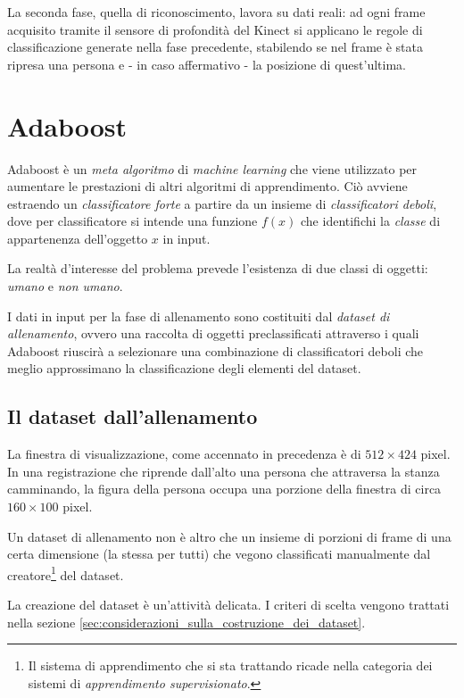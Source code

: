 \documentclass[a4paper,11pt,oneside]{article}
\begin{document}
			La seconda fase, quella di riconoscimento, lavora su dati reali: ad ogni frame acquisito tramite il sensore di profondità del Kinect si applicano le regole di classificazione generate nella fase precedente, stabilendo se nel frame è stata ripresa una persona e - in caso affermativo - la posizione di quest'ultima.
	

	\section{Adaboost} %
	\label{sec:adaboost}
		Adaboost è un \emph{meta algoritmo} di \emph{machine learning} che viene utilizzato per aumentare le prestazioni di altri algoritmi di apprendimento. Ciò avviene estraendo un \emph{classificatore forte} a partire da un insieme di \emph{classificatori deboli}, dove per classificatore si intende una funzione $f(x)$ che identifichi la \emph{classe} di appartenenza dell'oggetto $x$ in input.

		La realtà d'interesse del problema prevede l'esistenza di due classi di oggetti: \emph{umano} e \emph{non umano}.

		I dati in input per la fase di allenamento sono costituiti dal \emph{dataset di allenamento}, ovvero una raccolta di oggetti preclassificati attraverso i quali Adaboost riuscirà a selezionare una combinazione di classificatori deboli che meglio approssimano la classificazione degli elementi del dataset.

		\subsection{Il dataset dall'allenamento} %
		\label{sub:il_dataset_dall_allenamento}
			La finestra di visualizzazione, come accennato in precedenza è di $512 \times 424$ pixel. In una registrazione che riprende dall'alto una persona che attraversa la stanza camminando, la figura della persona occupa una porzione della finestra di circa $160 \times 100$ pixel.

			Un dataset di allenamento non è altro che un insieme di porzioni di frame di una certa dimensione (la stessa per tutti) che vegono classificati manualmente dal creatore\footnote{Il sistema di apprendimento che si sta trattando ricade nella categoria dei sistemi di \emph{apprendimento supervisionato}.} del dataset.

			La creazione del dataset è un'attività delicata. I criteri di scelta vengono trattati nella sezione \ref{sec:considerazioni_sulla_costruzione_dei_dataset}.
\end{document}
